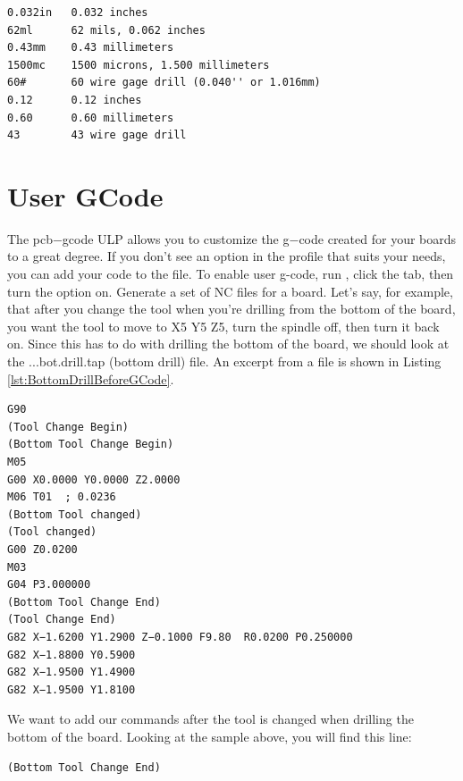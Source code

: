 \documentclass[11pt]{book}
\begin{document}
\begin{lstlisting}[caption={Sample entries for rack files},label={lst:SampleEntries}]
0.032in   0.032 inches
62ml      62 mils, 0.062 inches
0.43mm    0.43 millimeters
1500mc    1500 microns, 1.500 millimeters
60#       60 wire gage drill (0.040'' or 1.016mm)
0.12      0.12 inches
0.60      0.60 millimeters
43        43 wire gage drill
\end{lstlisting}



%
%
\section{User GCode}\label{sec:UserGCode}

The pcb−gcode ULP allows you to customize the g−code created for your boards to a great degree. If you don't see an option in the profile that suits your needs, you can add your code to the  file. To enable user g-code, run , click the  tab, then turn the  option on. Generate a set of NC files for a board. Let's say, for example, that after you change the tool when you're drilling from the bottom of the board, you want the tool to move to X5 Y5 Z5, turn the spindle off, then turn it back on. Since this has to do with drilling the bottom of the board, we should look at the ...bot.drill.tap (bottom drill) file. An excerpt from a file is shown in Listing \vref{lst:BottomDrillBeforeGCode}.

\begin{lstlisting}[caption={Bottom drill file before adding user g-code.},label={lst:BottomDrillBeforeGCode}]
G90
(Tool Change Begin)
(Bottom Tool Change Begin)
M05
G00 X0.0000 Y0.0000 Z2.0000
M06 T01  ; 0.0236
(Bottom Tool changed)
(Tool changed)
G00 Z0.0200
M03
G04 P3.000000
(Bottom Tool Change End)
(Tool Change End)
G82 X−1.6200 Y1.2900 Z−0.1000 F9.80  R0.0200 P0.250000
G82 X−1.8800 Y0.5900
G82 X−1.9500 Y1.4900
G82 X−1.9500 Y1.8100
\end{lstlisting}

We want to add our commands after the tool is changed when drilling the bottom of the board. Looking at the sample above, you will find this line:
\begin{lstlisting}[firstnumber=12]
(Bottom Tool Change End)
\end{lstlisting}
\end{document}
